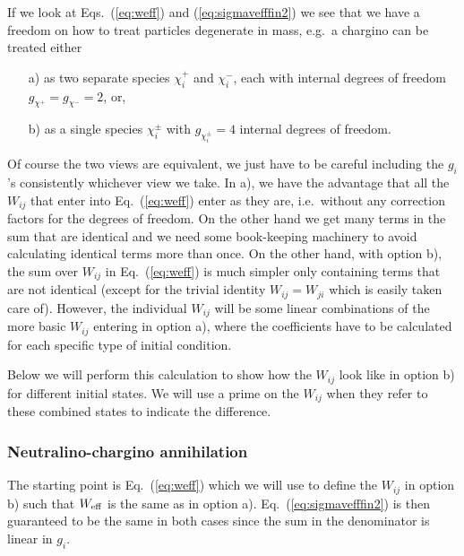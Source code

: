 If we look at Eqs.~(\ref{eq:weff}) and (\ref{eq:sigmavefffin2}) we see
that we have a freedom on how to treat particles degenerate in mass,
e.g.\ a chargino can be treated either 
\begin{enumerate}
\item[a)]
  as two separate species
  $\chi_{i}^+$ and $\chi_{i}^-$, each with internal degrees of freedom
  $g_{\chi^+}=g_{\chi^-}=2$, or,
\item[b)]
  as a single species
  $\chi_{i}^\pm$ with $g_{\chi_{i}^\pm}=4$ internal degrees of freedom. 
\end{enumerate}
Of course the two views are equivalent, we just have to be careful 
including the $g_{i}$'s consistently whichever view we take.
In a), we have the advantage that all the $W_{ij}$ that enter into 
Eq.~(\ref{eq:weff}) enter as they are, i.e.\ without any correction 
factors for the degrees of freedom. On the other hand we get many 
terms in the sum that are identical and we need some book-keeping 
machinery to avoid calculating identical terms more than once. On the 
other hand, with option b), the sum over $W_{ij}$ in Eq.~(\ref{eq:weff}) 
is much simpler only containing terms that are not identical (except 
for the trivial identity $W_{ij}=W_{ji}$ which is easily taken care of). 
However, the individual $W_{ij}$ will be some linear combinations of 
the more basic $W_{ij}$ entering in option a), where the coefficients 
have to be calculated for each specific type of initial condition. 

Below we will perform this calculation to show how the $W_{ij}$ look 
like in option b) for different initial states. We will use a prime on 
the $W_{ij}$ when they refer to these combined states to indicate the 
difference.

\subsubsection{Neutralino-chargino annihilation}

The starting point is Eq.~(\ref{eq:weff}) which we will use to define 
the $W_{ij}$ in option b) such that $W_{\rm eff}$ is the same as in 
option a). Eq.~(\ref{eq:sigmavefffin2}) is then guaranteed to be the 
same in both cases since the sum in the denominator is linear in $g_{i}$.

